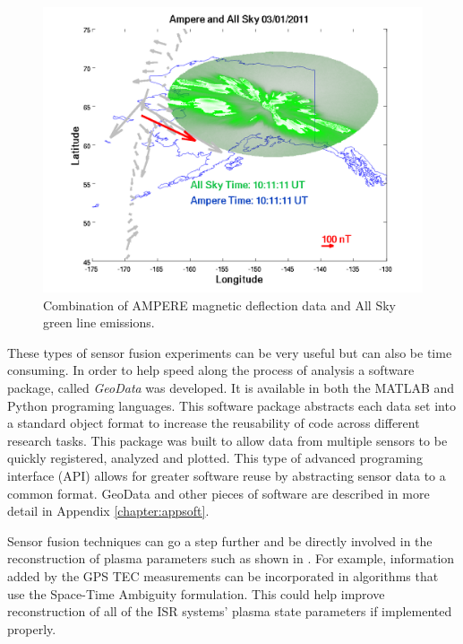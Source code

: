 \begin{figure}[h!]
\centering
\includegraphics[width=6.0in]{ampandallsky214}
\caption{Combination of AMPERE magnetic deflection data and All Sky green line emissions. }
\label{fig:swflow}
\end{figure}

These types of sensor fusion experiments can be very useful but can also be time consuming. In order to help speed along the process of analysis a software package, called \textit{GeoData} was developed. It is available in both the MATLAB \citep{john_swoboda_2016_154536} 
and Python \citep{john_swoboda_2016_154533} programing languages. This software package abstracts each data set into a standard object format to increase the reusability of code across different research tasks. This package was built to allow data from multiple sensors to be quickly registered, analyzed and plotted. This type of advanced programing interface (API) allows for greater software reuse by abstracting sensor data to a common format. GeoData and other pieces of software are described in more detail in Appendix \ref{chapter:appsoft}.

Sensor fusion techniques can go a step further and be directly involved in the reconstruction of plasma parameters such as shown in \citet{Semeter:2016gm}. For example, information added by the GPS TEC measurements can be incorporated in algorithms that use the Space-Time Ambiguity formulation. This could help improve reconstruction of all of the ISR systems' plasma state parameters if implemented properly.
